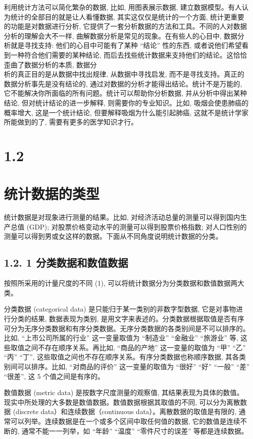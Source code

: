 \documentclass[10pt]{article}
\begin{document}
\begin{CJK*}{UTF8}{bsmi}
利用统计方法可以简化繁杂的数据, 比如, 用图表展示数据, 建立数据模型。有人认为统计的全部目的就是让人看懂数据, 其实这仅仅是统计的一个方面, 统计更重要的功能是对数据进行分析, 它提供了一套分析数据的方法和工具。不同的人对数据分析的理解会大不一样, 曲解数据分析是常见的现象。在有些人的心目中, 数据分析就是寻找支持: 他们的心目中可能有了某种 “结论” 性的东西, 或者说他们希望看到一种符合他们需要的某种结论, 而后去找些统计数据来支持他们的结论。这恰恰歪曲了数据分析的本质, 数据分\\
析的真正目的是从数据中找出规律, 从数据中寻找启发, 而不是寻找支持。真正的数据分析事先是没有结论的, 通过对数据的分析才能得出结论。统计不是万能的, 它不能解决你所面临的所有问题。统计可以帮助你分析数据, 并从分析中得出某种结论, 但对统计结论的进一步解释, 则需要你的专业知识。比如, 吸烟会使患肺癌的概率增大, 这是一个统计结论, 但要解释吸烟为什么能引起肺癌, 这就不是统计学家所能做到的了, 需要有更多的医学知识才行。

\section*{1.2}
\section*{统计数据的类型}
统计数据是对现象进行测量的结果。比如, 对经济活动总量的测量可以得到国内生产总值 (GDP); 对股票价格变动水平的测量可以得到股票价格指数; 对人口性别的测量可以得到男或女这样的数据。下面从不同角度说明统计数据的分类。

\subsection*{1.2. 1 分类数据和数值数据}
按照所采用的计量尺度的不同 (1), 可以将统计数据分为分类数据和数值数据两大类。

分类数据 (categorical data) 是只能归于某一类别的非数字型数据, 它是对事物进行分类的结果, 数据表现为类别, 是用文字来表述的。分类数据根据取值是否有序可分为无序分类数据和有序分类数据。无序分类数据的各类别间是不可以排序的。比如, “上市公司所属的行业” 这一变量取值为 “制造业” “金融业” “旅游业” 等, 这些取值之间不存在顺序关系。再比如, “商品的产地” 这一变量的取值为 “甲” “乙” “丙” “丁”, 这些取值之间也不存在顺序关系。有序分类数据也称顺序数据, 其各类别间可以排序。比如, “对商品的评价” 这一变量的取值为 “很好” “好” “一般” “差” “很差”, 这 5 个值之间是有序的。

数值数据 (metric data) 是按数字尺度测量的观察值, 其结果表现为具体的数值。现实中所处理的大多数是数值数据。数值数据根据其取值的不同, 可以分为离散数据 (discrete data）和连续数据（continuous data）。离散数据的取值是有限的, 通常可以列举。连续数据是在一个或多个区间中取任何值的数据, 它的数值是连续不断的, 通常不能一一列举，如 “年龄” “温度” “零件尺寸的误差” 等都是连续数据。


\end{CJK*}
\end{document}

